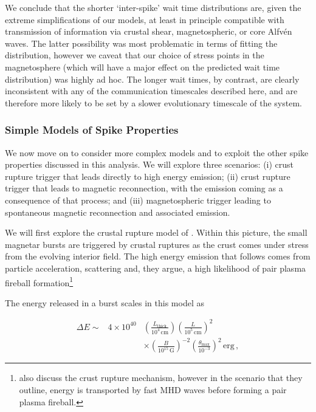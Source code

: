 \documentclass[12pt]{emulateapj}
\begin{document}



We conclude that the shorter `inter-spike' wait time distributions are, given the extreme simplifications of our models, at least in principle 
compatible with transmission of information via crustal shear, magnetospheric, or core Alfv\'en waves.  The latter possibility was most 
problematic in terms of fitting the distribution, however we caveat that our choice of stress points in the magnetosphere (which will have a 
major effect on the predicted wait time distribution) was highly ad hoc.   The longer wait times, by contrast, are clearly inconsistent with any 
of the communication timescales described here, and are therefore more likely to be set by a slower evolutionary timescale of the system.  

\subsubsection{Simple Models of Spike Properties}
We now move on to consider more complex models and to exploit the other spike properties discussed in this analysis. We will explore three 
scenarios: (i) crust rupture trigger that leads directly to high energy emission; (ii) crust rupture trigger that leads to magnetic reconnection, 
with the emission coming as a consequence of that process; and (iii) magnetospheric trigger leading to spontaneous magnetic reconnection 
and associated emission.

We will first explore the crustal rupture model of \citet{thompson1995}. Within this picture, the small magnetar bursts are triggered by crustal 
ruptures as the crust comes under stress from the evolving interior field. The high energy emission that follows comes from particle acceleration, 
scattering and, they argue, a high likelihood of pair plasma fireball formation\footnote{\citet{heyl2005b} also discuss the crust rupture mechanism, 
however in the scenario that they outline, energy is transported by fast MHD waves before forming a pair plasma fireball.}

The energy released in a burst scales in this model \citep[Equation 28ff.\ in ][]{thompson1995} as 

\begin{eqnarray}
\Delta E \sim & 4\times 10^{40} & \left(\frac{L_{\mathrm{thick}}}{10^{4}\,\mathrm{cm}} \right) \left( \frac{L}{10^{5}\,\mathrm{cm}}\right)^2  \\ \nonumber
&& \times \left( \frac{B}{10^{15}\,\mathrm{G}}\right)^{-2} \left(\frac{\theta_\mathrm{max}}{10^{-3}}\right)^2 \, \mathrm{erg} \, ,
\end{eqnarray}
\end{document}
